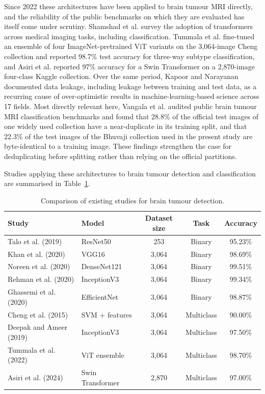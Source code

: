 \documentclass[final,3p,times,number]{elsarticle}
\begin{document}
Since 2022 these architectures have been applied to brain tumour MRI directly, and the reliability of the public benchmarks on which they are evaluated has itself come under scrutiny. Shamshad et al. \cite{shamshad2023} survey the adoption of transformers across medical imaging tasks, including classification. Tummala et al. \cite{tummala2022} fine-tuned an ensemble of four ImageNet-pretrained ViT variants on the 3,064-image Cheng collection and reported 98.7\% test accuracy for three-way subtype classification, and Asiri et al. \cite{asiri2024} reported 97\% accuracy for a Swin Transformer on a 2,870-image four-class Kaggle collection. Over the same period, Kapoor and Narayanan \cite{kapoor2023} documented data leakage, including leakage between training and test data, as a recurring cause of over-optimistic results in machine-learning-based science across 17 fields. Most directly relevant here, Vangala et al. \cite{vangala2026} audited public brain tumour MRI classification benchmarks and found that 28.8\% of the official test images of one widely used collection have a near-duplicate in its training split, and that 22.3\% of the test images of the Bhuvaji collection used in the present study are byte-identical to a training image. These findings strengthen the case for deduplicating before splitting rather than relying on the official partitions.

Studies applying these architectures to brain tumour detection and classification are summarised in Table~\ref{tab:existing-studies}.

\begin{table}[htbp]
\centering
\caption{Comparison of existing studies for brain tumour detection.}
\label{tab:existing-studies}
\small
\begin{tabular*}{\textwidth}{@{\extracolsep{\fill}}llccc@{}}
\toprule
Study & Model & Dataset size & Task & Accuracy \\
\midrule
Talo et al. (2019) \cite{ref16} & ResNet50 & 253 & Binary & 95.23\% \\
Khan et al. (2020) \cite{ref23} & VGG16 & 3,064 & Binary & 98.69\% \\
Noreen et al. (2020) \cite{ref24} & DenseNet121 & 3,064 & Binary & 99.51\% \\
Rehman et al. (2020) \cite{ref25} & InceptionV3 & 3,064 & Binary & 99.34\% \\
Ghassemi et al. (2020) \cite{ref26} & EfficientNet & 3,064 & Binary & 98.87\% \\
Cheng et al. (2015) \cite{ref5} & SVM + features & 3,064 & Multiclass & 90.00\% \\
Deepak and Ameer (2019) \cite{ref15} & InceptionV3 & 3,064 & Multiclass & 97.50\% \\
Tummala et al. (2022) \cite{tummala2022} & ViT ensemble & 3,064 & Multiclass & 98.70\% \\
Asiri et al. (2024) \cite{asiri2024} & Swin Transformer & 2,870 & Multiclass & 97.00\% \\
\bottomrule
\end{tabular*}
\end{table}
\end{document}
